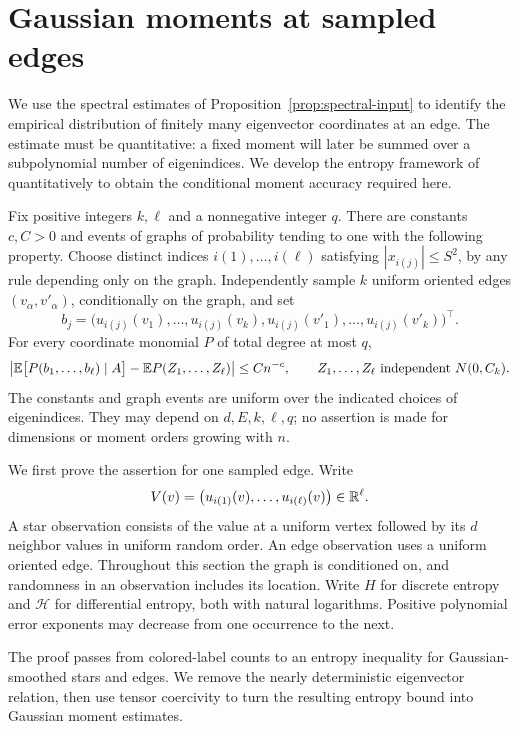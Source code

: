 \section{Gaussian moments at sampled edges}\label{sec:entropy}

We use the spectral estimates of Proposition~\ref{prop:spectral-input}
to identify the empirical distribution of finitely many eigenvector
coordinates at an edge. The estimate must be quantitative: a fixed
moment will later be summed over a subpolynomial number of eigenindices.
We develop the entropy framework of \citet{BackhauszSzegedy}
quantitatively to obtain the conditional moment accuracy required here.

\begin{proposition}\label{prop:edge-moments}
Fix positive integers \(k,\ell\) and a nonnegative integer \(q\).
There are constants \(c,C>0\) and events of graphs of probability tending
to one with the following property. Choose distinct indices
\(i(1),\ldots,i(\ell)\) satisfying \(|x_{i(j)}|\le S^2\), by any rule
depending only on the graph. Independently sample \(k\) uniform oriented
edges \((v_\alpha,v'_\alpha)\), conditionally on the graph, and set
\[
 b_j=\bigl(u_{i(j)}(v_1),\ldots,u_{i(j)}(v_k),
           u_{i(j)}(v'_1),\ldots,u_{i(j)}(v'_k)\bigr)^\top .
\]
For every coordinate monomial \(P\) of total degree at most \(q\),
\[
 \left|\mathbb E\bigl[P(b_1,\ldots,b_\ell)\mid A\bigr]
       -\mathbb E P(Z_1,\ldots,Z_\ell)\right|\le Cn^{-c},
 \qquad Z_1,\ldots,Z_\ell\ \text{independent }N(0,C_k).
\]
The constants and graph events are uniform over the indicated choices
of eigenindices. They may depend on \(d,E,k,\ell,q\); no assertion is
made for dimensions or moment orders growing with \(n\).
\end{proposition}

We first prove the assertion for one sampled edge. Write
\[
 V(v)=\bigl(u_{i(1)}(v),\ldots,u_{i(\ell)}(v)\bigr)\in\mathbb R^\ell.
\]
A star observation consists of the value at a uniform vertex followed
by its \(d\) neighbor values in uniform random order. An edge observation
uses a uniform oriented edge. Throughout this section the graph is
conditioned on, and randomness in an observation includes its location.
Write \(H\) for discrete entropy and \(\mathcal H\) for differential
entropy, both with natural logarithms. Positive polynomial error
exponents may decrease from one occurrence to the next.

The proof passes from colored-label counts to an entropy inequality
for Gaussian-smoothed stars and edges. We remove the nearly
deterministic eigenvector relation, then use tensor coercivity to turn
the resulting entropy bound into Gaussian moment estimates.

